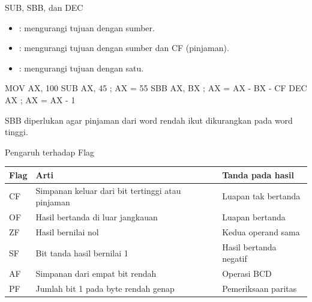 \documentclass[aspectratio=169,11pt]{beamer}
\begin{document}
\begin{frame}[fragile]{SUB, SBB, dan DEC}
\small
\begin{itemize}
    \item {}: mengurangi tujuan dengan
          sumber.
    \item {}: mengurangi tujuan dengan
          sumber dan CF (pinjaman).
    \item {}: mengurangi tujuan dengan satu.
\end{itemize}

\vspace{0.2em}
\begin{kodeasm}[numbers=none]
MOV AX, 100
SUB AX, 45          ; AX = 55
SBB AX, BX          ; AX = AX - BX - CF
DEC AX              ; AX = AX - 1
\end{kodeasm}

\vspace{0.1em}
{\footnotesize\color{obeGray}SBB diperlukan agar pinjaman dari word
rendah ikut dikurangkan pada word tinggi.\par}
\end{frame}

\begin{frame}{Pengaruh terhadap Flag}
\footnotesize
\begin{center}
\begin{tabular}{@{}>{\raggedright\arraybackslash}p{1.4cm}
    >{\raggedright\arraybackslash}p{6.6cm}
    >{\raggedright\arraybackslash}p{4.6cm}@{}}
    \toprule
    \textbf{Flag} & \textbf{Arti} & \textbf{Tanda pada hasil} \\
    \midrule
    CF & Simpanan keluar dari bit tertinggi atau pinjaman &
    Luapan tak bertanda \\
    \addlinespace
    OF & Hasil bertanda di luar jangkauan & Luapan bertanda \\
    \addlinespace
    ZF & Hasil bernilai nol & Kedua operand sama \\
    \addlinespace
    SF & Bit tanda hasil bernilai 1 & Hasil bertanda negatif \\
    \addlinespace
    AF & Simpanan dari empat bit rendah & Operasi BCD \\
    \addlinespace
    PF & Jumlah bit 1 pada byte rendah genap & Pemeriksaan paritas \\
    \bottomrule
\end{tabular}
\end{center}
\end{frame}
\end{document}
